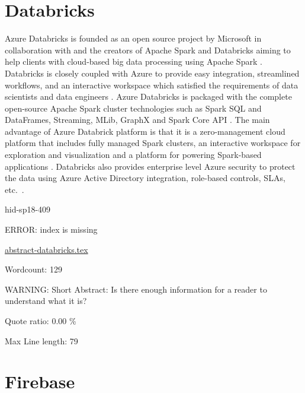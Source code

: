 \section{Databricks}

Azure Databricks is founded as an open source project by Microsoft in
collaboration with and the creators of Apache Spark and Databricks aiming to
help clients with cloud-based big data processing using Apache Spark
\cite{hid-sp18-409-www-databricks}. Databricks is closely coupled with Azure to
provide easy integration, streamlined workflows, and an interactive workspace
which satisfied the requirements of data scientists and data engineers
\cite{hid-sp18-409-www-databrick-doc}. Azure Databricks is packaged with the
complete open-source Apache Spark cluster technologies such as Spark SQL and
DataFrames, Streaming, MLib, GraphX and Spark Core API
\cite{hid-sp18-409-www-databrick-doc}. The main advantage of Azure Databrick
platform is that it is a zero-management cloud platform that includes fully
managed Spark clusters, an interactive workspace for exploration and
visualization and a platform for powering Spark-based applications
\cite{hid-sp18-409-www-databricks}. Databricks also provides enterprise level
Azure security to protect the data using Azure Active Directory integration,
role-based controls, SLAs, etc.~\cite{hid-sp18-409-www-databricks}.


\begin{IU}

hid-sp18-409

ERROR: index is missing

\href{https://github.com/cloudmesh-community/hid-sp18-409/blob/master//technology/abstract-databricks.tex}{abstract-databricks.tex}

 

Wordcount: 129

WARNING: Short Abstract: Is there enough information for a reader to understand what it is?


Quote ratio: 0.00 \%
 
Max Line length: 79
\end{IU}

\section{Firebase}

